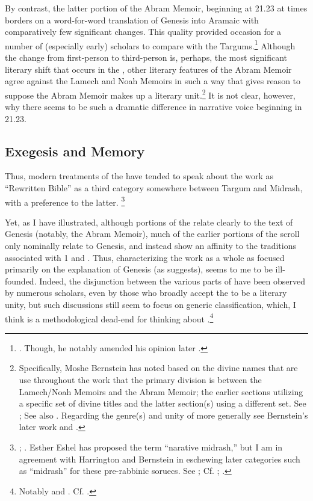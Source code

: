 By contrast, the latter portion of the Abram Memoir, beginning at 21.23 at times borders on a word-for-word translation of Genesis into Aramaic with comparatively few significant changes. This quality provided occasion for a number of (especially early) scholars to compare \ga with the Targums.\footnote{\cite[193]{black1983}. Though, he notably amended his opinion later \cite*{black_black-fohrer1968}.} Although the change from first-person to third-person is, perhaps, the most significant literary shift that occurs in the \ga, other literary features of the Abram Memoir agree against the Lamech and Noah Memoirs in such a way that gives reason to suppose the Abram Memoir makes up a literary unit.\footnote{Specifically, Moshe Bernstein has noted based on the divine names that are use throughout the work that the primary division is between the Lamech/Noah Memoirs and the Abram Memoir; the earlier sections utilizing a specific set of divine titles and the latter section(s) using a different set. See \cite{bernstein_jbl2009}; See also \cite[97]{falk2007}. Regarding the genre(s) and unity of \ga more generally see Bernstein's later work \cite*{bernstein_berthelot-etal2010} and \cite*{bernstein_as2010}.} It is not clear, however, why there seems to be such a dramatic difference in narrative voice beginning in 21.23.

\subsection{Exegesis and Memory}

Thus, modern treatments of the \ga have tended to speak about the work as ``Rewritten Bible'' as a third category somewhere between Targum and Midrash, with a preference to the latter.%
%
\footnote{\cite{evans_revq1988}; \cite[19]{fitzmyer2004}. Esther Eshel has proposed the term ``narative midrash,'' but I am in agreement with Harrington and Bernstein in eschewing later categories such as ``midrash'' for these pre-rabbinic soruecs. See \cite[182]{eshel_roitman-etal2011}; Cf. \cite[242]{harrington_kraft-nickelsburg1986}; \cite[327 n. 33; 328--329]{bernstein_berthelot-etal2010}.}

Yet, as I have illustrated, although portions of the \ga relate clearly to the text of Genesis (notably, the Abram Memoir), much of the earlier portions of the scroll only nominally relate to Genesis, and instead show an affinity to the traditions associated with 1 \enoch and \jub. Thus, characterizing the work as a whole as focused primarily on the explanation of Genesis (as \vermes suggests), seems to me to be ill-founded. Indeed, the disjunction between the various parts of \ga have been observed by numerous scholars, even by those who broadly accept the \ga to be a literary unity, but such discussions still seem to focus on generic classification, which, I think is a methodological dead-end for thinking about \ga.\footnote{Notably \cite{bernstein_as2010} and \cite{falk2007}. Cf. \cite{eshel_roitman-etal2011}.}

